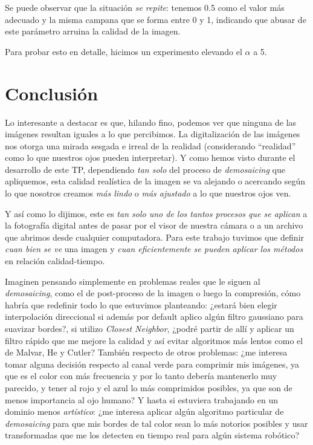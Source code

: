 Se puede observar que la situación \textit{se repite}: tenemos 0.5 como el valor más adecuado y la misma campana que se forma entre 0 y 1, indicando que abusar de este parámetro arruina la calidad de la imagen.

\vspace{\baselineskip}
Para probar esto en detalle, hicimos un experimento elevando el $\alpha$ a 5.


\newpage

\section{Conclusión}

Lo interesante a destacar es que, hilando fino, podemos ver que ninguna de las imágenes resultan iguales a lo que percibimos. La digitalización de las imágenes nos otorga una mirada sesgada e irreal de la realidad (considerando ``realidad'' como lo que nuestros ojos pueden interpretar). Y como hemos visto durante el desarrollo de este TP, dependiendo \textit{tan solo} del proceso de \textit{demosaicing} que apliquemos, esta calidad realística de la imagen se va alejando o acercando según lo que nosotros creamos \textit{más lindo} o \textit{más ajustado} a lo que nuestros ojos ven.

Y así como lo dijimos, este es \textit{tan solo uno de los tantos procesos que se aplican} a la fotografía digital antes de pasar por el visor de nuestra cámara o a un archivo que abrimos desde cualquier computadora. Para este trabajo tuvimos que definir \textit{cuan bien se ve} una imagen y \textit{cuan eficientemente se pueden aplicar los métodos} en relación calidad-tiempo. 

Imaginen pensando simplemente en problemas reales que le siguen al \textit{demosaicing}, como el de post-proceso de la imagen o luego la compresión, cómo habría que redefinir todo lo que estuvimos planteando: ¿estará bien elegir interpolación direccional si además por default aplico algún filtro gaussiano para suavizar bordes?, si utilizo \textit{Closest Neighbor}, ¿podré partir de allí y aplicar un filtro rápido que me mejore la calidad y así evitar algoritmos más lentos como el de Malvar, He y Cutler? También respecto de otros problemas: ¿me interesa tomar alguna decisión respecto al canal verde para comprimir mis imágenes, ya que es el color con más frecuencia y por lo tanto debería mantenerlo muy parecido, y tener al rojo y el azul lo más comprimidos posibles, ya que son de menos importancia al ojo humano? Y hasta si estuviera trabajando en un dominio menos \textit{artístico}: ¿me interesa aplicar algún algoritmo particular de \textit{demosaicing} para que mis bordes de tal color sean lo más notorios posibles y usar transformadas que me los detecten en tiempo real para algún sistema robótico?

